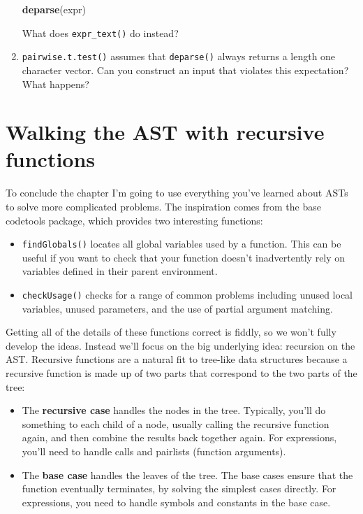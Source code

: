 \documentclass[]{book}
\newenvironment{Shaded}{\begin{snugshade}}{\end{snugshade}}
\newcommand{\KeywordTok}[1]{\textcolor[rgb]{0.27,0.27,0.27}{\textbf{#1}}}
\newcommand{\NormalTok}[1]{#1}
\begin{document}
\begin{enumerate}
\begin{Shaded}
\begin{Highlighting}[]
\KeywordTok{deparse}\NormalTok{(expr)}
\end{Highlighting}
\end{Shaded}

  What does \texttt{expr\_text()} do instead?
\item
  \texttt{pairwise.t.test()} assumes that \texttt{deparse()} always returns a length one
  character vector. Can you construct an input that violates this expectation?
  What happens?
\end{enumerate}

\hypertarget{ast-funs}{%
\section{Walking the AST with recursive functions}\label{ast-funs}}


To conclude the chapter I'm going to use everything you've learned about ASTs to solve more complicated problems. The inspiration comes from the base codetools package, which provides two interesting functions:

\begin{itemize}
\item
  \texttt{findGlobals()} locates all global variables used by a function. This
  can be useful if you want to check that your function doesn't inadvertently
  rely on variables defined in their parent environment.
\item
  \texttt{checkUsage()} checks for a range of common problems including
  unused local variables, unused parameters, and the use of partial
  argument matching.
\end{itemize}

Getting all of the details of these functions correct is fiddly, so we won't fully develop the ideas. Instead we'll focus on the big underlying idea: recursion on the AST. Recursive functions are a natural fit to tree-like data structures because a recursive function is made up of two parts that correspond to the two parts of the tree:

\begin{itemize}
\item
  The \textbf{recursive case} handles the nodes in the tree. Typically, you'll
  do something to each child of a node, usually calling the recursive function
  again, and then combine the results back together again. For expressions,
  you'll need to handle calls and pairlists (function arguments).
\item
  The \textbf{base case} handles the leaves of the tree. The base cases ensure
  that the function eventually terminates, by solving the simplest cases
  directly. For expressions, you need to handle symbols and constants in the
  base case.
\end{itemize}
\end{document}
